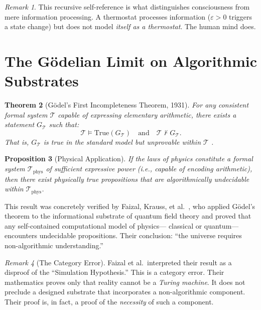 \documentclass[12pt, a4paper]{article}
\theoremstyle{plain}
\newtheorem{theorem}{Theorem}[section]
\newtheorem{proposition}[theorem]{Proposition}
\theoremstyle{definition}
\theoremstyle{remark}
\newtheorem{remark}[theorem]{Remark}
\newcommand{\calT}{\mathcal{T}}
\begin{document}
\begin{remark}
  This recursive self-reference is what distinguishes consciousness from
  mere information processing. A thermostat processes information
  ($\varepsilon > 0$ triggers a state change) but does not model
  \emph{itself as a thermostat}. The human mind does.
\end{remark}

\section{The G\"odelian Limit on Algorithmic Substrates}\label{sec:godel}

\begin{theorem}[G\"odel's First Incompleteness Theorem, 1931]\label{thm:godel}
  For any consistent formal system $\calT$ capable of expressing elementary
  arithmetic, there exists a statement $G_\calT$ such that:
  \begin{equation}
    \calT \models \text{True}(G_\calT) \quad \text{and} \quad
    \calT \not\vdash G_\calT.
  \end{equation}
  That is, $G_\calT$ is true in the standard model but unprovable within
  $\calT$ \citep{Godel1931}.
\end{theorem}

\begin{proposition}[Physical Application]\label{prop:physical_godel}
  If the laws of physics constitute a formal system $\calT_{\text{phys}}$
  of sufficient expressive power (i.e., capable of encoding arithmetic),
  then there exist physically true propositions that are \emph{algorithmically
  undecidable} within $\calT_{\text{phys}}$.
\end{proposition}

This result was concretely verified by Faizal, Krauss, et al.\ \citep{Faizal2025},
who applied G\"odel's theorem to the informational substrate of quantum field
theory and proved that any self-contained computational model of physics---
classical or quantum---encounters undecidable propositions. Their conclusion:
``the universe requires non-algorithmic understanding.''

\begin{remark}[The Category Error]
  Faizal et al.\ interpreted their result as a disproof of the ``Simulation
  Hypothesis.'' This is a category error. Their mathematics proves only that
  reality cannot be a \emph{Turing machine}. It does not preclude a designed
  substrate that incorporates a non-algorithmic component. Their proof is, in
  fact, a proof of the \emph{necessity} of such a component.
\end{remark}
\end{document}
